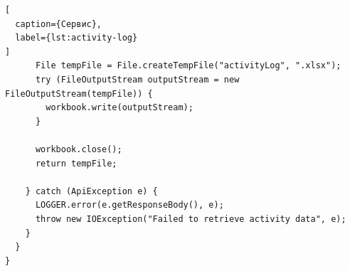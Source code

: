 \begin{lstlisting}[
  caption={Сервис},
  label={lst:activity-log}
]
      File tempFile = File.createTempFile("activityLog", ".xlsx");
      try (FileOutputStream outputStream = new FileOutputStream(tempFile)) {
        workbook.write(outputStream);
      }

      workbook.close();
      return tempFile;

    } catch (ApiException e) {
      LOGGER.error(e.getResponseBody(), e);
      throw new IOException("Failed to retrieve activity data", e);
    }
  }
}
\end{lstlisting}
